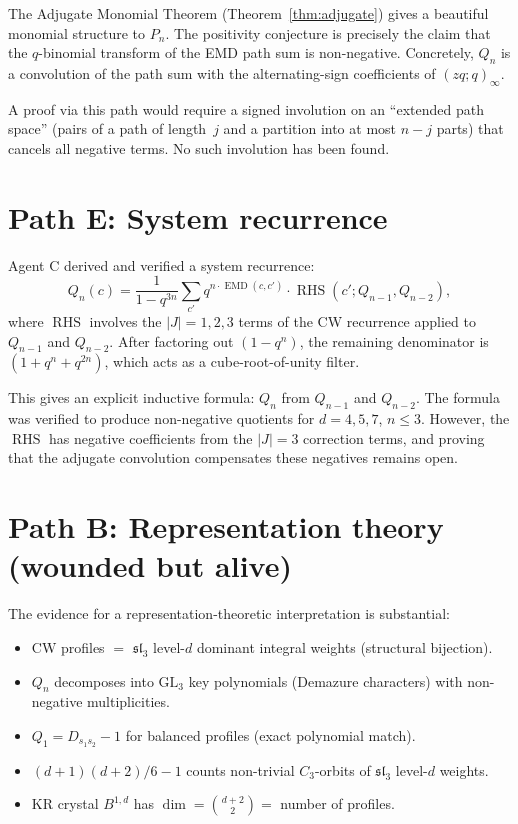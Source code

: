 \documentclass[11pt]{article}
\theoremstyle{definition}
\begin{document}
The Adjugate Monomial Theorem (Theorem~\ref{thm:adjugate}) gives a beautiful monomial structure to $P_n$. The positivity conjecture is precisely the claim that the $q$-binomial transform of the EMD path sum is non-negative. Concretely, $Q_n$ is a convolution of the path sum with the alternating-sign coefficients of $(zq;q)_\infty$.

A proof via this path would require a signed involution on an ``extended path space'' (pairs of a path of length~$j$ and a partition into at most $n - j$ parts) that cancels all negative terms. No such involution has been found.

\section{Path E: System recurrence}

Agent C derived and verified a system recurrence:
\[
Q_n(c) = \frac{1}{1 - q^{3n}} \sum_{c'} q^{n \cdot \operatorname{EMD}(c,c')} \cdot \operatorname{RHS}(c'; Q_{n-1}, Q_{n-2}),
\]
where $\operatorname{RHS}$ involves the $|J| = 1, 2, 3$ terms of the CW recurrence applied to $Q_{n-1}$ and $Q_{n-2}$. After factoring out $(1-q^n)$, the remaining denominator is $(1 + q^n + q^{2n})$, which acts as a cube-root-of-unity filter.

This gives an explicit inductive formula: $Q_n$ from $Q_{n-1}$ and $Q_{n-2}$. The formula was verified to produce non-negative quotients for $d = 4, 5, 7$, $n \leq 3$. However, the $\operatorname{RHS}$ has negative coefficients from the $|J| = 3$ correction terms, and proving that the adjugate convolution compensates these negatives remains open.

\section{Path B: Representation theory (wounded but alive)}

The evidence for a representation-theoretic interpretation is substantial:
\begin{itemize}
\item CW profiles $=$ $\mathfrak{sl}_3$ level-$d$ dominant integral weights (structural bijection).
\item $Q_n$ decomposes into $\mathrm{GL}_3$ key polynomials (Demazure characters) with non-negative multiplicities.
\item $Q_1 = D_{s_1 s_2} - 1$ for balanced profiles (exact polynomial match).
\item $(d+1)(d+2)/6 - 1$ counts non-trivial $C_3$-orbits of $\mathfrak{sl}_3$ level-$d$ weights.
\item KR crystal $B^{1,d}$ has $\dim = \binom{d+2}{2} =$ number of profiles.
\end{itemize}
\end{document}
